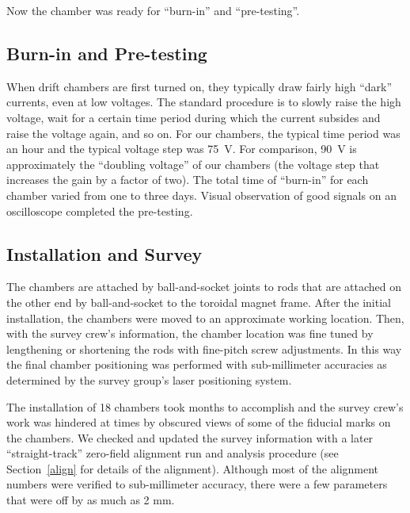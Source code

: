 Now the chamber was ready for ``burn-in'' and ``pre-testing''.

\subsection{Burn-in and Pre-testing}

When drift chambers are first turned on, they typically draw fairly high
``dark'' currents, even at low voltages.  The standard procedure is to
slowly raise the high voltage, wait for a certain time period during
which the current subsides and raise the voltage again, and so on.
For our chambers, the typical time period was an hour and the typical
voltage step was 75~V.  For comparison, 90~V is approximately the 
``doubling voltage'' of
our chambers (the voltage step that increases the gain by a factor
of two).  The total time of ``burn-in'' for each chamber varied from one to three days.
Visual observation of good signals on an oscilloscope completed
the pre-testing.

\subsection{Installation and Survey}

The chambers are attached by ball-and-socket joints to rods that are attached
on the other end by ball-and-socket to the toroidal magnet frame.
After the initial installation, the chambers were moved to an approximate
working location.  Then, with the survey crew's information, the chamber location
was fine tuned by lengthening or shortening the rods with fine-pitch screw adjustments.
In this way the final chamber positioning was performed with sub-millimeter accuracies as
determined by the survey group's laser positioning system.

The installation of 18 chambers took months to accomplish and the survey crew's work
was hindered at times by obscured views of some of the fiducial marks on the 
chambers.  We checked and updated the survey information with a later 
``straight-track'' zero-field alignment run and analysis procedure (see Section~\ref{align}
for details of the alignment).
Although most of the alignment numbers were verified to sub-millimeter accuracy, there
were a few parameters that were off by as much as 2 mm.

